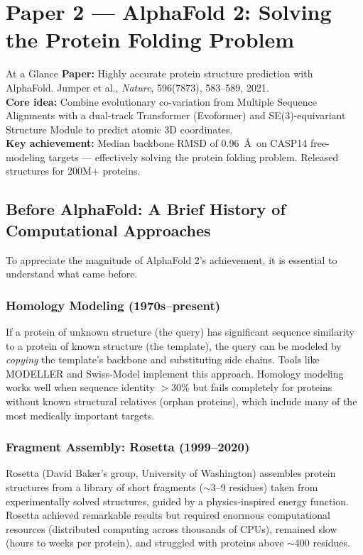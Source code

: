 ﻿\documentclass[12pt,a4paper]{article}
\begin{document}
\newpage
\section{Paper 2 --- AlphaFold 2: Solving the Protein Folding Problem}

\begin{keybox}{At a Glance}
\textbf{Paper:} Highly accurate protein structure prediction with AlphaFold. Jumper et al., \textit{Nature}, 596(7873), 583--589, 2021.\\
\textbf{Core idea:} Combine evolutionary co-variation from Multiple Sequence Alignments with a dual-track Transformer (Evoformer) and SE(3)-equivariant Structure Module to predict atomic 3D coordinates.\\
\textbf{Key achievement:} Median backbone RMSD of 0.96~\AA\ on CASP14 free-modeling targets --- effectively solving the protein folding problem. Released structures for 200M+ proteins.
\end{keybox}

\subsection{Before AlphaFold: A Brief History of Computational Approaches}

To appreciate the magnitude of AlphaFold 2's achievement, it is essential to understand what came before.

\subsubsection{Homology Modeling (1970s--present)}
If a protein of unknown structure (the query) has significant sequence similarity to a protein of known structure (the template), the query can be modeled by \emph{copying} the template's backbone and substituting side chains. Tools like MODELLER and Swiss-Model implement this approach. Homology modeling works well when sequence identity $> 30$\% but fails completely for proteins without known structural relatives (orphan proteins), which include many of the most medically important targets.

\subsubsection{Fragment Assembly: Rosetta (1999--2020)}
Rosetta (David Baker's group, University of Washington) assembles protein structures from a library of short fragments ($\sim$3--9 residues) taken from experimentally solved structures, guided by a physics-inspired energy function. Rosetta achieved remarkable results but required enormous computational resources (distributed computing across thousands of CPUs), remained slow (hours to weeks per protein), and struggled with proteins above $\sim$400 residues.
\end{document}
